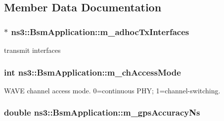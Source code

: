 \subsection{Member Data Documentation}
\subsubsection[{\texorpdfstring{m\+\_\+adhoc\+Tx\+Interfaces}{m_adhocTxInterfaces}}]{$\ast$ ns3\+::\+Bsm\+Application\+::m\+\_\+adhoc\+Tx\+Interfaces\hspace{0.3cm}{\ttfamily [private]}}\hypertarget{classns3_1_1BsmApplication_a0eecb4df76f2dd46564c5f0b14260e3b}{}\label{classns3_1_1BsmApplication_a0eecb4df76f2dd46564c5f0b14260e3b}


transmit interfaces 

\subsubsection[{\texorpdfstring{m\+\_\+ch\+Access\+Mode}{m_chAccessMode}}]{\setlength{\rightskip}{0pt plus 5cm}int ns3\+::\+Bsm\+Application\+::m\+\_\+ch\+Access\+Mode\hspace{0.3cm}{\ttfamily [private]}}\hypertarget{classns3_1_1BsmApplication_a752ca9febaa0e054d095240671dfc9f2}{}\label{classns3_1_1BsmApplication_a752ca9febaa0e054d095240671dfc9f2}


W\+A\+VE channel access mode. 0=continuous P\+HY; 1=channel-\/switching. 

\subsubsection[{\texorpdfstring{m\+\_\+gps\+Accuracy\+Ns}{m_gpsAccuracyNs}}]{\setlength{\rightskip}{0pt plus 5cm}double ns3\+::\+Bsm\+Application\+::m\+\_\+gps\+Accuracy\+Ns\hspace{0.3cm}{\ttfamily [private]}}\hypertarget{classns3_1_1BsmApplication_a4c66027982c4d715a89e568ce5424eca}{}\label{classns3_1_1BsmApplication_a4c66027982c4d715a89e568ce5424eca}


